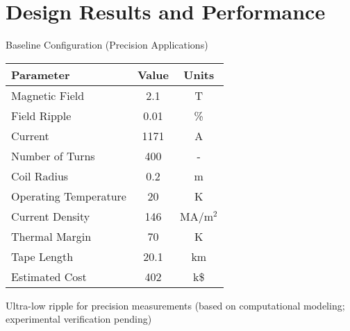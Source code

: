 \section{Design Results and Performance}

\begin{frame}{Baseline Configuration (Precision Applications)}
    \begin{table}[h]
        \centering
        \begin{tabular}{lcc}
            \toprule
            \textbf{Parameter} & \textbf{Value} & \textbf{Units} \\
            \midrule
            Magnetic Field & 2.1 & T \\
            Field Ripple & 0.01 & \% \\
            Current & 1171 & A \\
            Number of Turns & 400 & - \\
            Coil Radius & 0.2 & m \\
            Operating Temperature & 20 & K \\
            Current Density & 146 & MA/m$^2$ \\
            Thermal Margin & 70 & K \\
            Tape Length & 20.1 & km \\
            Estimated Cost & 402 & k\$ \\
            \bottomrule
        \end{tabular}
    \end{table}
    
     Ultra-low ripple for precision measurements (based on computational modeling; experimental verification pending)
\end{frame}

